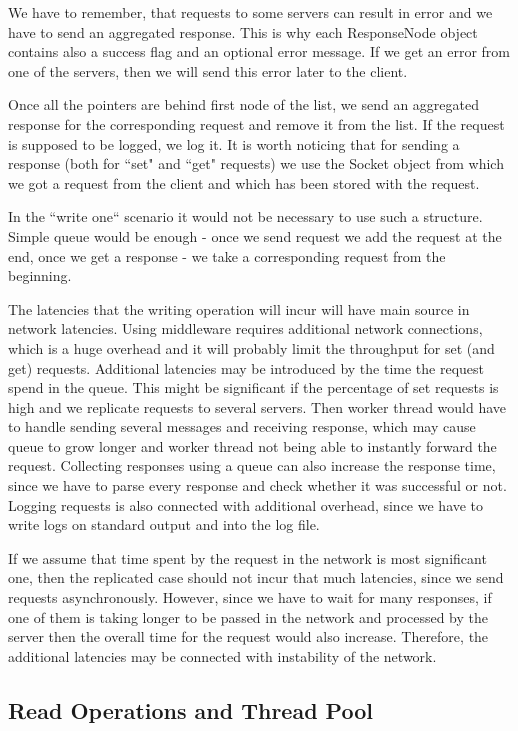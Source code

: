 \documentclass[11pt]{article}
\begin{document}
We have to remember, that requests to some servers can result in error and we have to send an aggregated response. This is why each ResponseNode object contains also a success flag and an optional error message. If we get an error from one of the servers, then we will send this error later to the client.

Once all the pointers are behind first node of the list, we send an aggregated response for the corresponding request and remove it from the list. If the request is supposed to be logged, we log it. It is worth noticing that for sending a response (both for ``set" and ``get" requests) we use the Socket object from which we got a request from the client and which has been stored with the request. 

In the ``write one`` scenario it would not be necessary to use such a structure. Simple queue would be enough - once we send request we add the request at the end, once we get a response - we take a corresponding request from the beginning.

The latencies that the writing operation will incur will have main source in network latencies. Using middleware requires additional network connections, which is a huge overhead and it will probably limit the throughput for set (and get) requests. Additional latencies may be introduced by the time the request spend in the queue. This might be significant if the percentage of set requests is high and we replicate requests to several servers. Then worker thread would have to handle sending several messages and receiving response, which may cause queue to grow longer and worker thread not being able to instantly forward the request. Collecting responses using a queue can also increase the response time, since we have to parse every response and check whether it was successful or not. Logging requests is also connected with additional overhead, since we have to write logs on standard output and into the log file.  

If we assume that time spent by the request in the network is most significant one, then the replicated case should not incur that much latencies, since we send requests asynchronously. However, since we have to wait for many responses, if one of them is taking longer to be passed in the network and processed by the server then the overall time for the request would also increase. Therefore, the additional latencies may be connected with instability of the network.

\subsection{Read Operations and Thread Pool}\label{sec:desc:reads}
\end{document}
